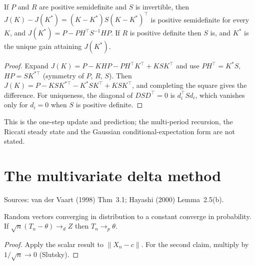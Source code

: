 \begin{theorem}
\label{thm:kalman-optimal}
\leanok
{}
If $P$ and $R$ are positive semidefinite and $S$ is invertible, then $J(K) - J(K^*) = (K-K^*)S(K-K^*)^\top$ is positive
semidefinite for every $K$, and $J(K^*) = P - PH^\top S^{-1}HP$. If $R$ is positive definite then $S$ is, and $K^*$ is the unique gain attaining $J(K^*)$.
\end{theorem}
\begin{proof}
\leanok
Expand $J(K) = P - KHP - PH^\top K^\top + KSK^\top$ and use $PH^\top = K^*S$, $HP = SK^{*\top}$ (symmetry of $P$, $R$,
$S$). Then $J(K) = P - KSK^{*\top} - K^*SK^\top + KSK^\top$, and completing the square gives the difference. For uniqueness, the diagonal of $DSD^\top = 0$ is $d_i^\top Sd_i$, which vanishes only for $d_i = 0$ when $S$ is positive definite.
\end{proof}

This is the one-step update and prediction; the multi-period recursion, the Riccati steady state and the Gaussian
conditional-expectation form are not stated.

\section{The multivariate delta method}
\label{sec:delta-vec}

Sources: van der Vaart (1998) Thm~3.1; Hayashi (2000) Lemma~2.5(b).

\begin{lemma}
\label{lem:const-vec}
\leanok
{}
Random vectors converging in distribution to a constant converge in probability. If $\sqrt n(T_n-\theta)\to_d Z$ then
$T_n\to_p\theta$.
\end{lemma}
\begin{proof}
\leanok
Apply the scalar result to $\|X_n - c\|$. For the second claim, multiply by $1/\sqrt n\to0$ (Slutsky).
\end{proof}

